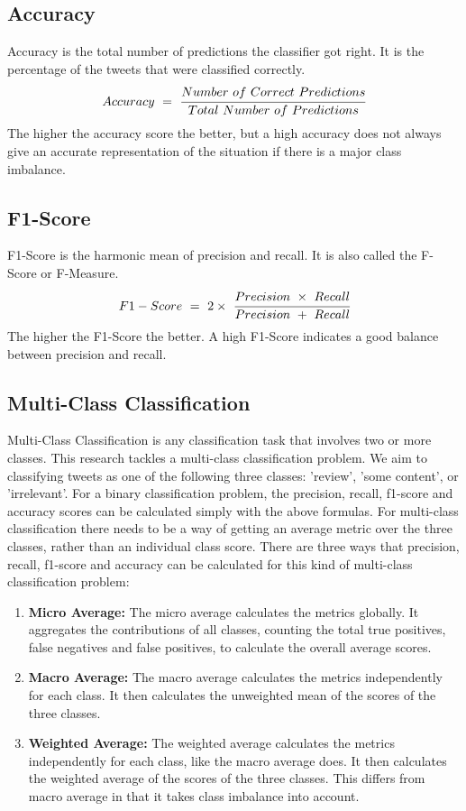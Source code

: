 \subsection*{Accuracy}
Accuracy is the total number of predictions the classifier got right. It is the percentage of the tweets that were classified correctly.
\begin{equation}
    Accuracy\ =\ \cfrac{Number\ of\ Correct\ Predictions}{Total\ Number\ of\ Predictions}
\end{equation}
The higher the accuracy score the better, but a high accuracy does not always give an accurate representation of the situation if there is a major class imbalance.

\subsection*{F1-Score}
F1-Score is the harmonic mean of precision and recall. It is also called the F-Score or F-Measure. 
\begin{equation}
    F1-Score\ =\ 2 \times\ \cfrac{Precision\ \times\ Recall}{Precision\ +\ Recall}
\end{equation}
The higher the F1-Score the better. A high F1-Score indicates a good balance between precision and recall.

\subsection*{Multi-Class Classification}
Multi-Class Classification is any classification task that involves two or more classes. This research tackles a multi-class classification problem. We aim to classifying tweets as one of the following three classes: 'review', 'some content', or 'irrelevant'. For a binary classification problem, the precision, recall, f1-score and accuracy scores can be calculated simply with the above formulas. For multi-class classification there needs to be a way of getting an average metric over the three classes, rather than an individual class score.
There are three ways that precision, recall, f1-score and accuracy can be calculated for this kind of multi-class classification problem:
\begin{enumerate}
    \item \textbf{Micro Average:}\newline
    The micro average calculates the metrics globally. It aggregates the contributions of all classes, counting the total true positives, false negatives and false positives, to calculate the overall average scores.  
    \item \textbf{Macro Average:}\newline
    The macro average calculates the metrics independently for each class. It then calculates the unweighted mean of the scores of the three classes.
    \item \textbf{Weighted Average:}\newline
    The weighted average calculates the metrics independently for each class, like the macro average does. It then calculates the weighted average of the scores of the three classes. This differs from macro average in that it takes class imbalance into account.
\end{enumerate}

